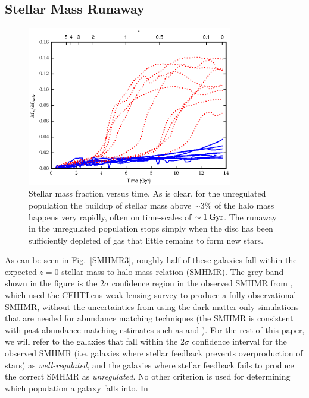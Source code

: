 \subsection{Stellar Mass Runaway}
\begin{figure}
    \includegraphics[width=0.8\textwidth]{figures3/stellar_fraction_time.eps}
    \caption[Stellar mass fraction evolution in MUGS2]{Stellar mass fraction
    versus time.  As is clear, for the unregulated population the buildup of
    stellar mass above $\sim3\%$ of the halo mass happens very rapidly, often on
    time-scales of $\sim1\>{\rm Gyr}$.  The runaway in the unregulated population stops
    simply when the disc has been sufficiently depleted of gas that little
    remains to form new stars.}
    \label{stellar_fraction_time3}
\end{figure}
As can be seen in Fig.~\ref{SMHMR3}, roughly half of these galaxies fall within
the expected $z=0$ stellar mass to halo mass relation (SMHMR).  The grey band
shown in the figure is the $2\sigma$ confidence region in the observed SMHMR
from \citet{Hudson2015}, which used the CFHTLens weak lensing survey to produce
a fully-observational SMHMR, without the uncertainties from using the dark
matter-only simulations that are needed for abundance matching techniques (the
\citet{Hudson2015} SMHMR is consistent with past abundance matching estimates
such as \citet{Behroozi2013} and \citet{Moster2013}).  For the rest of this
paper, we will refer to the galaxies that fall within the $2\sigma$ confidence
interval for the observed SMHMR (i.e. galaxies where stellar feedback prevents
overproduction of stars) as {\it well-regulated}, and the galaxies where stellar
feedback fails to produce the correct SMHMR as {\it unregulated}.  No other
criterion is used for determining which population a galaxy falls into. In
